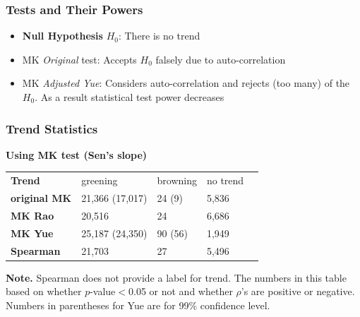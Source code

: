 \documentclass[serif, xcolor={dvipsnames}]{beamer} %
\begin{document}
\fi
\begin{frame}
\frametitle{Tests and Their Powers}
\begin{itemize}%
\item {\bf Null Hypothesis}
$H_0$: There is no trend
\item MK {\color{red}\emph{Original}} test: Accepts $H_0$ falsely due to auto-correlation
\item MK {\color{red}\emph{Adjusted Yue}}: Considers auto-correlation and rejects (too many) of the $H_0$. 
As a result statistical test power decreases
\end{itemize}
\end{frame}
\begin{frame}[t]
\frametitle{Trend Statistics}
{\bf Using MK test (Sen's slope)}
\begin{table}[!ht]
\centering
\captionsetup{singlelinecheck=false, format=hang}
\label{tab:Trendcounts}
\begin{tabular}{lllll}
\bottomrule
\rowcolor{shadecolor} \textbf{Trend} & 
 greening & browning & no trend \\ 
\textbf{original MK}  &                                21,366 (17,017) & 24 (9) & 5,836 \\
\rowcolor{shadecolor} \textbf{MK Rao}  & 20,516 & 24 & 6,686 \\
\textbf{MK Yue}  &  25,187 (24,350) & 90 (56) & 1,949 \\
\rowcolor{aliceblue}\textbf{Spearman}  & 21,703 & 27 & 5,496\\
\toprule
\end{tabular}
\end{table}
\begin{tcolorbox}
{\scriptsize{\bf Note.} Spearman does not provide a label for trend. The numbers
in this table based on whether $p$-value$<$0.05 or not and whether $\rho$'s are positive or negative.
Numbers in parentheses for Yue are for 99\% confidence level.
}
\end{tcolorbox}
\end{frame}
\end{document}
